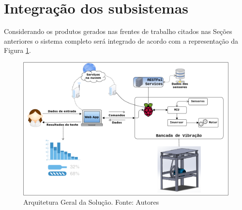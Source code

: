 
\section{Integração dos subsistemas}

Considerando os produtos gerados nas frentes de trabalho citados nas Seções anteriores o sistema completo será integrado de acordo com
a representação da Figura \ref{fig:arquitetura_solucao}.

\begin{figure}[H]
\centering
\includegraphics[scale=0.45]{figuras/arquitetura_solucao.png}
\caption{Arquitetura Geral da Solução.  Fonte: Autores}
\label{fig:arquitetura_solucao}
\end{figure}


